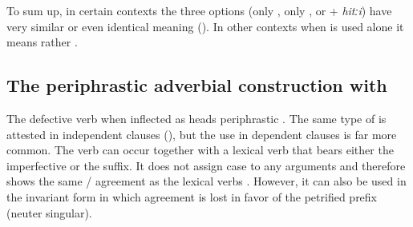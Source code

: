 To sum up, in certain contexts the three options (only , only , or  + \textit{hitːi}) have very similar or even identical meaning (). In other contexts when  is used alone it means rather .



\subsection{The periphrastic adverbial construction with  }
\label{sec:periphrastic adverbial construction belle}

The defective verb   when inflected as  heads periphrastic . The same type of  is attested in independent clauses (), but the use in dependent clauses is far more common. The verb can occur together with a lexical verb that bears either the imperfective or the  suffix. It does not assign case to any arguments and therefore shows the same / agreement as the lexical verbs . However, it can also be used in the invariant form   in which  agreement is lost in favor of the petrified prefix  (neuter singular).

